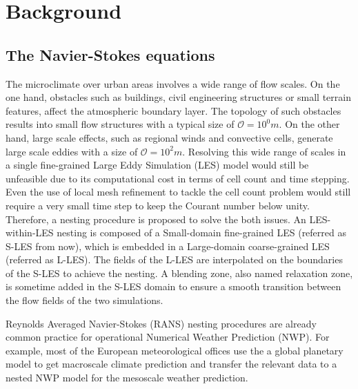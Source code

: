 \chapter{Background}
\label{sec: Background}


\section{The Navier-Stokes equations}
\label{sec: The Navier-Stokes equations}

The microclimate over urban areas involves a wide range of flow scales. On the one hand, obstacles such as buildings, civil engineering structures or small  terrain features, affect the atmospheric boundary layer. The topology of such obstacles results into small flow structures with a typical size of $\mathcal{O}=10^{0}m$. On the other hand, large scale effects, such as regional winds and convective cells, generate large scale eddies with a size of $\mathcal{O}=10^{2}m$. Resolving this wide range of scales in a single fine-grained Large Eddy Simulation (LES) model would still be unfeasible due to its computational cost in terms of cell count and time stepping. Even the use of local mesh refinement to tackle the cell count problem would still require a very small time step to keep the Courant number below unity. Therefore, a nesting procedure is proposed to solve the both issues. An LES-within-LES nesting is composed of a Small-domain fine-grained LES (referred as S-LES from now), which is embedded in a Large-domain coarse-grained LES (referred as L-LES). The fields of the L-LES are interpolated on the boundaries of the S-LES to achieve the nesting. A blending zone, also named relaxation zone, is sometime added in the S-LES domain to ensure a smooth transition between the flow fields of the two simulations.

Reynolds Averaged Navier-Stokes (RANS) nesting procedures are already common practice for operational Numerical Weather Prediction (NWP). For example, most of the European meteorological offices use the a global planetary model to get macroscale climate prediction and transfer the relevant data to a nested NWP model for the mesoscale weather prediction.

